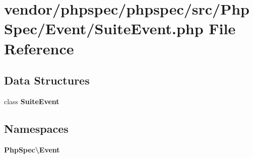 \section{vendor/phpspec/phpspec/src/\+Php\+Spec/\+Event/\+Suite\+Event.php File Reference}
\label{_suite_event_8php}
\subsection*{Data Structures}
\begin{DoxyCompactItemize}
\item 
class {\bf Suite\+Event}
\end{DoxyCompactItemize}
\subsection*{Namespaces}
\begin{DoxyCompactItemize}
\item 
 {\bf Php\+Spec\textbackslash{}\+Event}
\end{DoxyCompactItemize}
